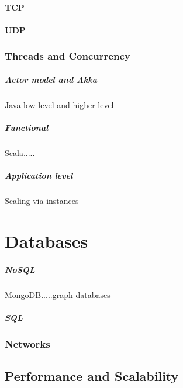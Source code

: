 \documentclass[a4paper, 11pt]{book}
\begin{document}
{    \subsubsection{TCP}

    \subsubsection{UDP}

    \subsection{Threads and Concurrency}

    \paragraph{Actor model and Akka}
    Java low level and higher level

    \paragraph{Functional}
    Scala.....

    \paragraph{Application level}
    Scaling via instances


    \chapter{Databases}

    \paragraph{NoSQL}
    MongoDB.....graph databases

    \paragraph{SQL}

    \subsection{Networks}


    \section{Performance and Scalability}

}
\end{document}
